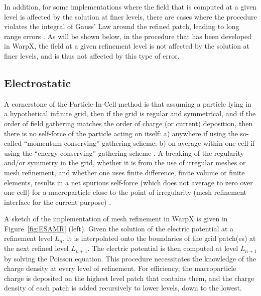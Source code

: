 In addition, for some implementations where the field that is computed at a given level is affected by the solution at finer levels, there are cases where the procedure violates the integral of Gauss' Law around the refined patch, leading to long range errors \cite{Vaylpb2002,Colellajcp2010}. As will be shown below, in the procedure that has been developed in WarpX, the field at a given refinement level is not affected by the solution at finer levels, and is thus not affected by this type of error.

\subsection{Electrostatic}
A cornerstone of the Particle-In-Cell method is that assuming a particle lying in a hypothetical infinite grid, then if the grid is regular and symmetrical, and if the order of field gathering matches the order of charge (or current) deposition, then there is no self-force of the particle acting on itself: a) anywhere if using the so-called ``momentum conserving'' gathering scheme; b) on average within one cell if using the ``energy conserving'' gathering scheme \cite{Birdsalllangdon}. A breaking of the regularity and/or symmetry in the grid, whether it is from the use of irregular meshes or mesh refinement, and whether one uses finite difference, finite volume or finite elements, results in a net spurious self-force (which does not average to zero over one cell)  for a macroparticle close to the point of irregularity (mesh refinement interface for the current purpose) \cite{Vaylpb2002,Colellajcp2010}.

A sketch of the implementation of mesh refinement in WarpX is given in Figure~\ref{fig:ESAMR} (left). Given the solution of the electric potential at a refinement level $L_n$, it is interpolated onto the boundaries of the grid patch(es) at the next refined level $L_{n+1}$. The electric potential is then computed at level $L_{n+1}$ by solving the Poisson equation. This procedure necessitates the knowledge of the charge density at every level of refinement. For efficiency, the macroparticle charge is deposited on the highest level patch that contains them, and the charge density of each patch is added recursively to lower levels, down to the lowest.

